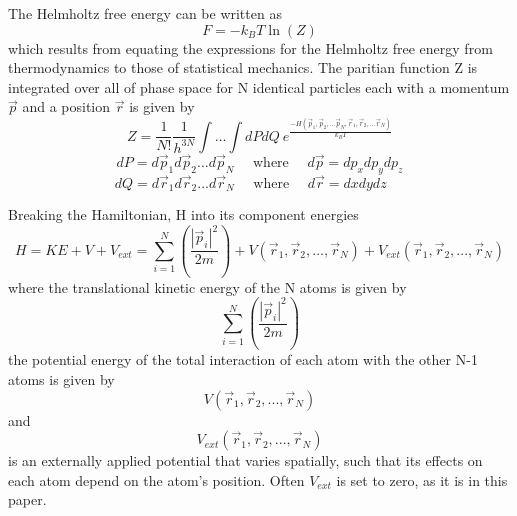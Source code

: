 \documentclass[double,12pt]{beavtex}
\begin{document}
The Helmholtz free energy can be written as
\begin{equation}{F=-k_{B}T\ln(Z)}\end{equation}
which results from equating the expressions for the Helmholtz free energy from thermodynamics to those of statistical mechanics. The paritian function Z is integrated over all of phase space for N identical particles each with a momentum $\vec{p}$ and a position $\vec{r}$ is given by
\begin{equation}{Z=}\frac{1}{N!}\frac{1}{h^{3N}}\int{...}\int{dPdQ}~e^\frac{-H(\vec{p}_1,\vec{p}_2,...\vec{p}_N,\vec{r}_1, \vec{r}_2,...\vec{r}_N)}{k_BT}\end{equation}
\begin{displaymath}{dP=d\vec{p}_1d\vec{p}_2...d\vec{p}_N \mbox{~~~~where~~~~} d\vec{p}=dp_xdp_ydp_z}\end{displaymath}
\begin{displaymath}{dQ=d\vec{r}_1d\vec{r}_2...d\vec{r}_N \mbox{~~~~where~~~~} d\vec{r}=dxdydz\mbox{~~~~}}\end{displaymath}

Breaking the Hamiltonian, H into its component energies
\begin{equation}{H = KE + V + V_{ext} = \sum_{i=1}^N\left(\frac{|\vec{p}_i|^2}{2m}\right)+V(\vec{r}_1,\vec{r}_2,{...},\vec{r}_N)+V_{ext}(\vec{r}_1,\vec{r}_2,{...},\vec{r}_N)}\end{equation}
where the translational kinetic energy of the N atoms is given by \begin{displaymath}{\sum_{i=1}^N\left(\frac{|\vec{p}_i|^2}{2m}\right)}\end{displaymath}
the potential energy of the total interaction of each atom with the other N-1 atoms is given by
\begin{displaymath}{V(\vec{r}_1,\vec{r}_2,{...},\vec{r}_N)}\end{displaymath} and \begin{displaymath}{V_{ext}(\vec{r}_1,\vec{r}_2,{...},\vec{r}_N)}\end{displaymath} is an externally applied potential that varies spatially, such that its effects on each atom depend on the atom's position. Often $V_{ext}$ is set to zero, as it is in this paper. 
\end{document}
